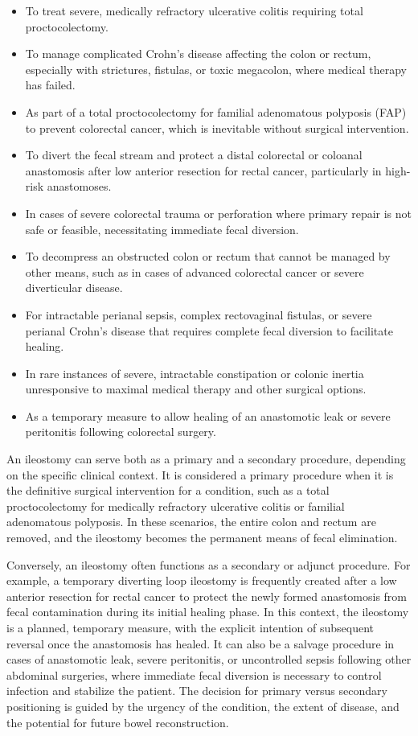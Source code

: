 \begin{itemize}
  \item To treat severe, medically refractory ulcerative colitis requiring total proctocolectomy.
  \item To manage complicated Crohn's disease affecting the colon or rectum, especially with strictures, fistulas, or toxic megacolon, where medical therapy has failed.
  \item As part of a total proctocolectomy for familial adenomatous polyposis (FAP) to prevent colorectal cancer, which is inevitable without surgical intervention.
  \item To divert the fecal stream and protect a distal colorectal or coloanal anastomosis after low anterior resection for rectal cancer, particularly in high-risk anastomoses.
  \item In cases of severe colorectal trauma or perforation where primary repair is not safe or feasible, necessitating immediate fecal diversion.
  \item To decompress an obstructed colon or rectum that cannot be managed by other means, such as in cases of advanced colorectal cancer or severe diverticular disease.
  \item For intractable perianal sepsis, complex rectovaginal fistulas, or severe perianal Crohn's disease that requires complete fecal diversion to facilitate healing.
  \item In rare instances of severe, intractable constipation or colonic inertia unresponsive to maximal medical therapy and other surgical options.
  \item As a temporary measure to allow healing of an anastomotic leak or severe peritonitis following colorectal surgery.
\end{itemize}

An ileostomy can serve both as a primary and a secondary procedure, depending on the specific clinical context. It is considered a primary procedure when it is the definitive surgical intervention for a condition, such as a total proctocolectomy for medically refractory ulcerative colitis or familial adenomatous polyposis. In these scenarios, the entire colon and rectum are removed, and the ileostomy becomes the permanent means of fecal elimination.

Conversely, an ileostomy often functions as a secondary or adjunct procedure. For example, a temporary diverting loop ileostomy is frequently created after a low anterior resection for rectal cancer to protect the newly formed anastomosis from fecal contamination during its initial healing phase. In this context, the ileostomy is a planned, temporary measure, with the explicit intention of subsequent reversal once the anastomosis has healed. It can also be a salvage procedure in cases of anastomotic leak, severe peritonitis, or uncontrolled sepsis following other abdominal surgeries, where immediate fecal diversion is necessary to control infection and stabilize the patient. The decision for primary versus secondary positioning is guided by the urgency of the condition, the extent of disease, and the potential for future bowel reconstruction.

